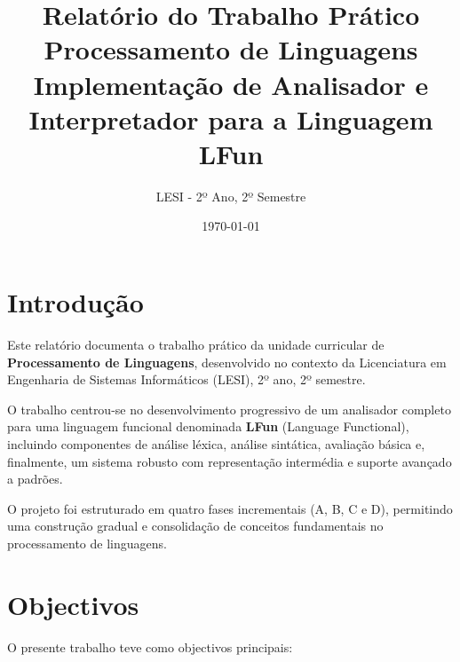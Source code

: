 \documentclass[11pt,a4paper]{report}
\title{\textbf{Relatório do Trabalho Prático} \\[0.5cm]
        \large Processamento de Linguagens \\[0.3cm]
        \large Implementação de Analisador e Interpretador para a Linguagem LFun}
\author{LESI - 2º Ano, 2º Semestre}
\date{\today}
\begin{document}
\maketitle

\newpage
\tableofcontents
\newpage

\chapter{Introdução}

Este relatório documenta o trabalho prático da unidade curricular de \textbf{Processamento de Linguagens}, desenvolvido no contexto da Licenciatura em Engenharia de Sistemas Informáticos (LESI), 2º ano, 2º semestre.

O trabalho centrou-se no desenvolvimento progressivo de um analisador completo para uma linguagem funcional denominada \textbf{LFun} (Language Functional), incluindo componentes de análise léxica, análise sintática, avaliação básica e, finalmente, um sistema robusto com representação intermédia e suporte avançado a padrões.

O projeto foi estruturado em quatro fases incrementais (A, B, C e D), permitindo uma construção gradual e consolidação de conceitos fundamentais no processamento de linguagens.

\chapter{Objectivos}

O presente trabalho teve como objectivos principais:
\end{document}
